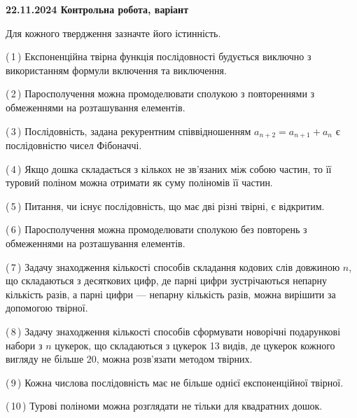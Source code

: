 \documentclass[12pt, ukrainian]{article}
\begin{document}
\begin {large}
\begin {large}
\begin {large}
\begin {large}
\begin {large}
\begin {large}
\begin {large}
\begin {large}
\begin {large}
\begin {large}
\begin {large}
\begin {large}
\begin {large}
\begin {large}
\begin {large}
\begin {large}
\begin {large}
\begin {large}
\begin {large}
\begin {large}
\begin {large}
\begin {large}
\begin {large}
\textbf{22.11.2024 Контрольна робота, варіант  }\par


{
Для кожного твердження зазначте його істинність.\par

\vspace{2mm}

(\,1\,) Експоненційна твірна функція послідовності будується виключно з використанням формули включення та виключення.%



(\,2\,) Паросполучення можна промоделювати сполукою з повтореннями з обмеженнями на розташування елементів.%



(\,3\,) Послідовність, задана рекурентним співвідношенням $a_{n+2}=a_{n+1}+a_{n}$ є послідовністю чисел Фібоначчі.%



(\,4\,) Якщо дошка складається з кількох не зв’язаних між собою частин, то її туровий поліном можна отримати як суму поліномів її частин.%



(\,5\,) Питання, чи існує послідовність, що має дві різні твірні, є відкритим.%



(\,6\,) Паросполучення можна промоделювати сполукою без повторень з обмеженнями на розташування елементів.%



(\,7\,) Задачу знаходження кількості способів складання кодових слів довжиною $n$, що складаються з десяткових цифр, де парні цифри зустрічаються непарну кількість разів, а парні цифри — непарну кількість разів, можна вирішити за допомогою твірної.%



(\,8\,) Задачу знаходження кількості способів сформувати новорічні подарункові набори з $n$ цукерок, що складаються з цукерок 13 видів, де цукерок кожного вигляду не більше 20, можна розв’язати методом твірних.%



(\,9\,) Кожна числова послідовність має не більше однієї  експоненційної твірної.%



(\,10\,) Турові поліноми можна розглядати не тільки для квадратних дошок.%




\vspace{5mm}
}
\newpage


\end{large}
\end{large}
\end{large}
\end{large}
\end{large}
\end{large}
\end{large}
\end{large}
\end{large}
\end{large}
\end{large}
\end{large}
\end{large}
\end{large}
\end{large}
\end{large}
\end{large}
\end{large}
\end{large}
\end{large}
\end{large}
\end{large}
\end{large}
\end{document}
